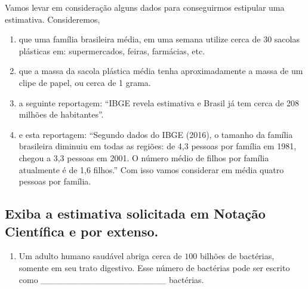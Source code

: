 Vamos levar em consideração alguns dados para conseguirmos estipular uma estimativa. Consideremos,
\begin{enumerate}
\item {} 
que uma família brasileira média, em uma semana utilize cerca de 30 sacolas plásticas em: supermercados, feiras, farmácias, etc.

\item {} 
que a massa da sacola plástica média tenha aproximadamente a massa de um clipe de papel, ou cerca de 1 grama.

\item {} 
a seguinte reportagem: “IBGE revela estimativa e Brasil já tem cerca de 208 milhões de habitantes”.

\item {} 
e esta reportagem: “Segundo dados do IBGE (2016), o tamanho da família brasileira diminuiu em todas as regiões: de 4,3 pessoas por família em 1981, chegou a 3,3 pessoas em 2001. O número médio de filhos por família atualmente é de 1,6 filhos.” Com isso vamos considerar em média quatro pessoas por família.

\end{enumerate}


\subsection{Exiba a estimativa solicitada em Notação Científica e por extenso.}
\label{\detokenize{NO103-A:exiba-a-estimativa-solicitada-em-notacao-cientifica-e-por-extenso}}\begin{enumerate}
\item {} 
Um adulto humano saudável abriga cerca de \(100\) bilhões de bactérias, somente em seu trato digestivo. Esse número de bactérias pode ser escrito como \_\_\_\_\_\_\_\_\_\_\_\_\_\_\_\_\_\_\_\_ bactérias.

\end{enumerate}

